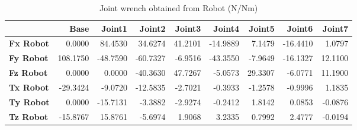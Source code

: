 \begin{table}[h!]
	\centering
	\caption{Joint wrench obtained from Robot (N/Nm)}
	\label{wrech_Robot_Pose7}
	\begin{tabular}{|l|r|r|r|r|r|r|r|r|}
		\hline
		\textbf{} & \textbf{Base} & \textbf{Joint1}  & \textbf{Joint2}  & \textbf{Joint3}  & \textbf{Joint4}  & \textbf{Joint5}  & \textbf{Joint6}  & \textbf{Joint7} \\ \hline
		\textbf{Fx Robot}  & 0.0000        & 84.4530        & 34.6274        & 41.2101        & -14.9889        & 7.1479        & -16.4410        & 1.0797 \\ \hline
		\textbf{Fy Robot}  & 108.1750        & -48.7590        & -60.7327        & -6.9516        & -43.3550        & -7.9649        & -16.1327        & 12.1100 \\ \hline
		\textbf{Fz Robot}  & 0.0000        & 0.0000        & -40.3630        & 47.7267        & -5.0573        & 29.3307        & -6.0771        & 11.1900 \\ \hline
		\textbf{Tx Robot}  & -29.3424        & -9.0720        & -12.5835        & -2.7021        & -0.3933        & -1.2578        & -0.9996        & 1.1835 \\ \hline
		\textbf{Ty Robot}  & 0.0000        & -15.7131        & -3.3882        & -2.9274        & -0.2412        & 1.8142        & 0.0853        & -0.0876 \\ \hline
		\textbf{Tz Robot}  & -15.8767        & 15.8761        & -5.6974        & 1.9068        & 3.2335        & 0.7992        & 2.4777        & -0.0194 \\ \hline
	\end{tabular}
\end{table}

